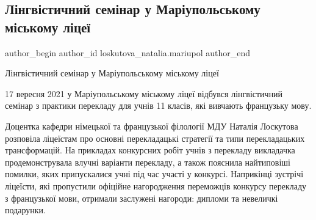  
 
 
 
 

\subsection{Лінгвістичний семінар у Маріупольському міському ліцеї}
\label{sec:19_09_2021.fb.loskutova_natalia.mariupol.1.lingvistic_seminar_mariupol_miskij_licej}

\ifcmt
 author_begin
   author_id loskutova_natalia.mariupol
 author_end
\fi

Лінгвістичний семінар у Маріупольському міському  ліцеї

17 вересня 2021 у Маріупольському міському  ліцеї відбувся лінгвістичний
семінар з практики перекладу для учнів 11 класів, які вивчають французьку мову.


Доцентка кафедри німецької та французької філології МДУ Наталія Лоскутова
розповіла ліцеїстам про основні перекладацькі стратегії та типи перекладацьких
трансформацій. На прикладах конкурсних робіт учнів з перекладу викладачка
продемонструвала влучні варіанти перекладу, а також пояснила найтиповіші
помилки, яких припускалися учні під час участі у конкурсі. Наприкінці зустрічі
ліцеїсти, які пропустили офіційне нагородження переможців конкурсу перекладу з
французької мови, отримали заслужені нагороди: дипломи та невеличкі подарунки.

